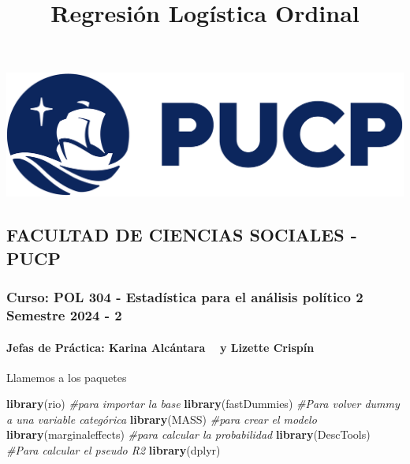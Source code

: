 \documentclass[
]{article}
\title{Regresión Logística Ordinal}
\author{}
\date{\vspace{-2.5em}}
\newenvironment{Shaded}{\begin{snugshade}}{\end{snugshade}}
\newcommand{\CommentTok}[1]{\textcolor[rgb]{0.56,0.35,0.01}{\textit{#1}}}
\newcommand{\FunctionTok}[1]{\textcolor[rgb]{0.13,0.29,0.53}{\textbf{#1}}}
\newcommand{\NormalTok}[1]{#1}
\begin{document}
\maketitle

{
\setcounter{tocdepth}{2}
\tableofcontents
}
\begin{flushleft}\includegraphics[width=0.3\linewidth]{logoPUCP} \end{flushleft}

\hypertarget{facultad-de-ciencias-sociales---pucp}{%
\subsection{\texorpdfstring{\textbf{FACULTAD DE CIENCIAS SOCIALES -
PUCP}
}{FACULTAD DE CIENCIAS SOCIALES - PUCP  }}\label{facultad-de-ciencias-sociales---pucp}}

\hypertarget{curso-pol-304---estaduxedstica-para-el-anuxe1lisis-poluxedtico-2-semestre-2024---2}{%
\subsubsection{Curso: POL 304 - Estadística para el análisis político 2
\textbar{} Semestre 2024 -
2}\label{curso-pol-304---estaduxedstica-para-el-anuxe1lisis-poluxedtico-2-semestre-2024---2}}

\hypertarget{jefas-de-pruxe1ctica-karina-alcuxe1ntara-y-lizette-crispuxedn}{%
\paragraph{\texorpdfstring{Jefas de Práctica: Karina Alcántara 👩‍🏫 y
Lizette Crispín
👩‍🏫}{Jefas de Práctica: Karina Alcántara 👩‍🏫 y Lizette Crispín 👩‍🏫 }}\label{jefas-de-pruxe1ctica-karina-alcuxe1ntara-y-lizette-crispuxedn}}

Llamemos a los paquetes

\begin{Shaded}
\begin{Highlighting}[]
\FunctionTok{library}\NormalTok{(rio) }\CommentTok{\#para importar la base}
\FunctionTok{library}\NormalTok{(fastDummies) }\CommentTok{\#Para volver dummy a una variable categórica}
\FunctionTok{library}\NormalTok{(MASS) }\CommentTok{\#para crear el modelo}
\FunctionTok{library}\NormalTok{(marginaleffects) }\CommentTok{\#para calcular la probabilidad}
\FunctionTok{library}\NormalTok{(DescTools) }\CommentTok{\#Para calcular el pseudo R2}
\FunctionTok{library}\NormalTok{(dplyr)}
\end{Highlighting}
\end{Shaded}
\end{document}
